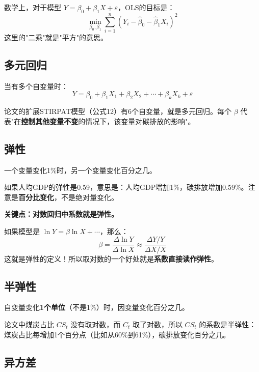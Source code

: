 \documentclass[12pt, a4paper]{article}
\begin{document}
数学上，对于模型 $Y = \beta_0 + \beta_1 X + \varepsilon$，OLS的目标是：
\[
\min_{\beta_0, \beta_1} \sum_{i=1}^{n} (Y_i - \hat{\beta}_0 - \hat{\beta}_1 X_i)^2
\]
这里的"二乘"就是"平方"的意思。

\subsection{多元回归}

当有多个自变量时：
\[
Y = \beta_0 + \beta_1 X_1 + \beta_2 X_2 + \cdots + \beta_k X_k + \varepsilon
\]

\begin{tipbox}[论文中的STIRPAT就是多元回归]
论文的扩展STIRPAT模型（公式12）有6个自变量，就是多元回归。每个 $\beta$ 代表"在\textbf{控制其他变量不变}的情况下，该变量对碳排放的影响"。
\end{tipbox}

\subsection{弹性}

\begin{conceptbox}[弹性]
一个变量变化1\%时，另一个变量变化百分之几。
\end{conceptbox}

\begin{examplebox}[弹性的直觉]
如果人均GDP的弹性是0.59，意思是：人均GDP增加1\%，碳排放增加0.59\%。注意是\textbf{百分比变化}，不是绝对量变化。
\end{examplebox}

\textbf{关键点：对数回归中系数就是弹性。}

如果模型是 $\ln Y = \beta \ln X + \cdots$，那么：
\[
\beta = \frac{\Delta \ln Y}{\Delta \ln X} \approx \frac{\Delta Y / Y}{\Delta X / X}
\]
这就是弹性的定义！所以取对数的一个好处就是\textbf{系数直接读作弹性}。

\subsection{半弹性}

\begin{conceptbox}[半弹性]
自变量变化\textbf{1个单位}（不是1\%）时，因变量变化百分之几。
\end{conceptbox}

论文中煤炭占比 $CS_t$ 没有取对数，而 $C_t$ 取了对数，所以 $CS_t$ 的系数是半弹性：煤炭占比每增加1个百分点（比如从60\%到61\%），碳排放变化百分之几。

\subsection{异方差}
\end{document}
